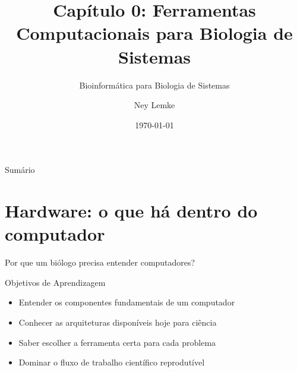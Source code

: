 


\title[Cap. 0: Ferramentas Computacionais]{Capítulo 0: Ferramentas Computacionais para Biologia de Sistemas}
\subtitle{Bioinformática para Biologia de Sistemas}
\author{Ney Lemke}
\date{\today}



\begin{frame}
\titlepage
\end{frame}

\begin{frame}{Sumário}
\tableofcontents
\end{frame}

\section{Hardware: o que há dentro do computador}

\begin{frame}{Por que um biólogo precisa entender computadores?}
\begin{block}{Objetivos de Aprendizagem}
\begin{itemize}
    \item Entender os componentes fundamentais de um computador
    \item Conhecer as arquiteturas disponíveis hoje para ciência
    \item Saber escolher a ferramenta certa para cada problema
    \item Dominar o fluxo de trabalho científico reprodutível
\end{itemize}
\end{block}

\vspace{0.3cm}

\end{frame}

